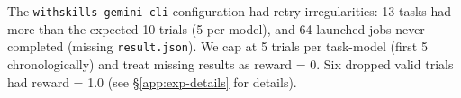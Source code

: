 The \texttt{withskills-gemini-cli} configuration had retry irregularities: 13 tasks had more than the expected 10 trials (5 per model), and 64 launched jobs never completed (missing \texttt{result.json}). We cap at 5 trials per task-model (first 5 chronologically) and treat missing results as reward = 0. Six dropped valid trials had reward = 1.0 (see \S\ref{app:exp-details} for details).





